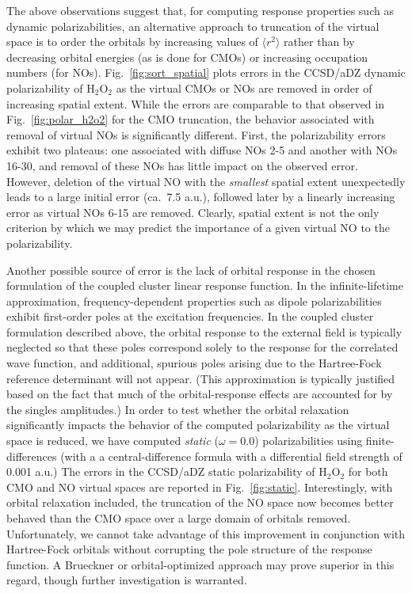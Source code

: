 The above observations suggest that, for computing response properties such as
dynamic polarizabilities, an alternative approach to truncation of the virtual
space is to order the orbitals by increasing values of $\langle r^2 \rangle$
rather than by decreasing orbital energies (as is done for CMOs) or increasing
occupation numbers (for NOs).  Fig.~\ref{fig:sort_spatial} plots errors in the
CCSD/aDZ dynamic polarizability of H$_2$O$_2$ as the virtual CMOs or NOs are
removed in order of increasing spatial extent.  While the errors are
comparable to that observed in Fig.~\ref{fig:polar_h2o2} for the CMO
truncation, the behavior associated with removal of virtual NOs is
significantly different.  First, the polarizability errors exhibit two
plateaus: one associated with diffuse NOs 2-5 and another with NOs 16-30, and
removal of these NOs has little impact on the observed error.  However,
deletion of the virtual NO with the {\em smallest} spatial extent unexpectedly
leads to a large initial error (ca.\ 7.5 a.u.), followed later by a linearly
increasing error as virtual NOs 6-15 are removed.  Clearly, spatial extent is
not the only criterion by which we may predict the importance of a given
virtual NO to the polarizability.

Another possible source of error is the lack of orbital response in the chosen
formulation of the coupled cluster linear response function.\cite{Koch94:BCC}
In the infinite-lifetime approximation, frequency-dependent properties such as
dipole polarizabilities exhibit first-order poles at the excitation
frequencies.  In the coupled cluster formulation described above, the orbital
response to the external field is typically neglected so that these poles
correspond solely to the response for the correlated wave function, and
additional, spurious poles arising due to the Hartree-Fock reference
determinant will not appear.  (This approximation is typically justified based
on the fact that much of the orbital-response effects are accounted for by the
singles amplitudes.\cite{Christiansen95:CC2})  In order to test whether the
orbital relaxation significantly impacts the behavior of the computed
polarizability as the virtual space is reduced, we have computed {\em static}
($\omega = 0.0$) polarizabilities using finite-differences (with a a
central-difference formula with a differential field strength of 0.001 a.u.)
The errors in the CCSD/aDZ static polarizability of H$_2$O$_2$ for both CMO
and NO virtual spaces are reported in Fig.~\ref{fig:static}.  Interestingly,
with orbital relaxation included, the truncation of the NO space now becomes
better behaved than the CMO space over a large domain of orbitals removed.
Unfortunately, we cannot take advantage of this improvement in conjunction
with Hartree-Fock orbitals without corrupting the pole structure of the
response function.  A Brueckner or orbital-optimized approach may prove
superior in this regard, though further investigation is
warranted.\cite{Koch94:BCC,Pedersen01}

